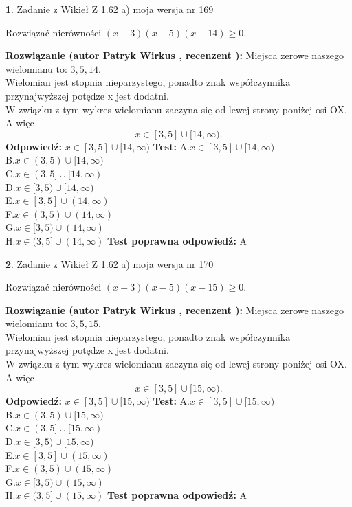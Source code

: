 \documentclass[12pt, a4paper]{article}
\theoremstyle{definition} %
\newtheorem{zad}{}
\newcommand{\zadStart}[1]{\begin{zad}#1\newline}
\newcommand{\zadStop}{\end{zad}}
\newcommand{\rozwStart}[2]{\noindent \textbf{Rozwiązanie (autor #1 , recenzent #2): }\newline}
\newcommand{\rozwStop}{\newline}
\newcommand{\odpStart}{\noindent \textbf{Odpowiedź:}\newline}
\newcommand{\odpStop}{\newline}
\newcommand{\testStart}{\noindent \textbf{Test:}\newline}
\newcommand{\testStop}{\newline}
\newcommand{\kluczStart}{\noindent \textbf{Test poprawna odpowiedź:}\newline}
\newcommand{\kluczStop}{\newline}
\begin{document}
\zadStart{Zadanie z Wikieł Z 1.62 a) moja wersja nr 169}

Rozwiązać nierówności $(x-3)(x-5)(x-14)\ge0$.
\zadStop
\rozwStart{Patryk Wirkus}{}
Miejsca zerowe naszego wielomianu to: $3, 5, 14$.\\
Wielomian jest stopnia nieparzystego, ponadto znak współczynnika przy\linebreak najwyższej potędze x jest dodatni.\\ W związku z tym wykres wielomianu zaczyna się od lewej strony poniżej osi OX. A więc $$x \in [3,5] \cup [14,\infty).$$
\rozwStop
\odpStart
$x \in [3,5] \cup [14,\infty)$
\odpStop
\testStart
A.$x \in [3,5] \cup [14,\infty)$\\
B.$x \in (3,5) \cup [14,\infty)$\\
C.$x \in (3,5] \cup [14,\infty)$\\
D.$x \in [3,5) \cup [14,\infty)$\\
E.$x \in [3,5] \cup (14,\infty)$\\
F.$x \in (3,5) \cup (14,\infty)$\\
G.$x \in [3,5) \cup (14,\infty)$\\
H.$x \in (3,5] \cup (14,\infty)$
\testStop
\kluczStart
A
\kluczStop



\zadStart{Zadanie z Wikieł Z 1.62 a) moja wersja nr 170}

Rozwiązać nierówności $(x-3)(x-5)(x-15)\ge0$.
\zadStop
\rozwStart{Patryk Wirkus}{}
Miejsca zerowe naszego wielomianu to: $3, 5, 15$.\\
Wielomian jest stopnia nieparzystego, ponadto znak współczynnika przy\linebreak najwyższej potędze x jest dodatni.\\ W związku z tym wykres wielomianu zaczyna się od lewej strony poniżej osi OX. A więc $$x \in [3,5] \cup [15,\infty).$$
\rozwStop
\odpStart
$x \in [3,5] \cup [15,\infty)$
\odpStop
\testStart
A.$x \in [3,5] \cup [15,\infty)$\\
B.$x \in (3,5) \cup [15,\infty)$\\
C.$x \in (3,5] \cup [15,\infty)$\\
D.$x \in [3,5) \cup [15,\infty)$\\
E.$x \in [3,5] \cup (15,\infty)$\\
F.$x \in (3,5) \cup (15,\infty)$\\
G.$x \in [3,5) \cup (15,\infty)$\\
H.$x \in (3,5] \cup (15,\infty)$
\testStop
\kluczStart
A
\kluczStop
\end{document}
